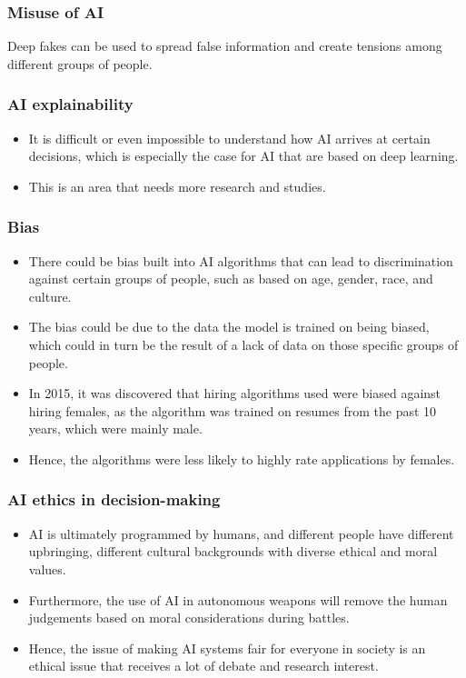 \documentclass[11pt]{article}
\begin{document}
\subsubsection{Misuse of AI}
\label{sec:org430439f}
Deep fakes can be used to spread false information and create tensions among different groups of people.
\subsubsection{AI explainability}
\label{sec:orgbf7e582}
\begin{itemize}
\item It is difficult or even impossible to understand how AI arrives at certain decisions, which is especially the case for AI that are based on deep learning.
\item This is an area that needs more research and studies.
\end{itemize}
\subsubsection{Bias}
\label{sec:org9343cc6}
\begin{itemize}
\item There could be bias built into AI algorithms that can lead to discrimination against certain groups of people, such as based on age, gender, race, and culture.
\item The bias could be due to the data the model is trained on being biased, which could in turn be the result of a lack of data on those specific groups of people.
\item In 2015, it was discovered that hiring algorithms used were biased against hiring females, as the algorithm was trained on resumes from the past 10 years, which were mainly male.
\item Hence, the algorithms were less likely to highly rate applications by females.
\end{itemize}
\subsubsection{AI ethics in decision-making}
\label{sec:org5efe03b}
\begin{itemize}
\item AI is ultimately programmed by humans, and different people have different upbringing, different cultural backgrounds with diverse ethical and moral values.
\item Furthermore, the use of AI in autonomous weapons will remove the human judgements based on moral considerations during battles.
\item Hence, the issue of making AI systems fair for everyone in society is an ethical issue that receives a lot of debate and research interest.
\end{itemize}
\end{document}
